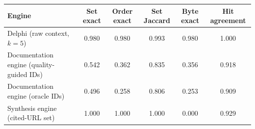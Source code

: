 \begin{tabular}{lccccc}
\toprule
Engine & Set exact & Order exact & Set Jaccard & Byte exact & Hit agreement \\
\midrule
Delphi (raw context, $k{=}5$) & 0.980 & 0.980 & 0.993 & 0.980 & 1.000 \\
Documentation engine (quality-guided IDs) & 0.542 & 0.362 & 0.835 & 0.356 & 0.918 \\
Documentation engine (oracle IDs) & 0.496 & 0.258 & 0.806 & 0.253 & 0.909 \\
Synthesis engine (cited-URL set) & 1.000 & 1.000 & 1.000 & 0.000 & 0.929 \\
\bottomrule
\end{tabular}%